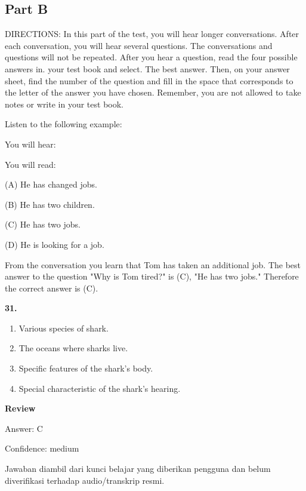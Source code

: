 \documentclass[12pt]{article}
\begin{document}
\subsection*{Part B}
DIRECTIONS: In this part of the test, you will hear longer conversations. After each conversation, you will hear several questions. The conversations and questions will not be repeated. After you hear a question, read the four possible answers in. your test book and select. The best answer. Then, on your answer sheet, find the number of the question and fill in the space that corresponds to the letter of the answer you have chosen. Remember, you are not allowed to take notes or write in your test book.\par
\begin{exampleblock}
Listen to the following example:\par
You will hear:\par
You will read:\par
(A) He has changed jobs.\par
(B) He has two children.\par
(C) He has two jobs.\par
(D) He is looking for a job.\par
From the conversation you learn that Tom has taken an additional job. The best answer to the question "Why is Tom tired?" is (C), "He has two jobs." Therefore the correct answer is (C).\par
\end{exampleblock}
\noindent\textbf{31.}
\begin{enumerate}[label=(\Alph*),leftmargin=*,itemsep=0.2em]
\item Various species of shark.
\item The oceans where sharks live.
\item Specific features of the shark's body.
\item Special characteristic of the shark's hearing.
\end{enumerate}
\par
\begingroup
\setlength{\parskip}{0pt}
\setlength{\parindent}{0pt}
\textbf{Review}\par
Answer: C\par
Confidence: medium\par
Jawaban diambil dari kunci belajar yang diberikan pengguna dan belum diverifikasi terhadap audio/transkrip resmi.\par
\endgroup
\par
\vspace{0.25\baselineskip}
\end{document}
